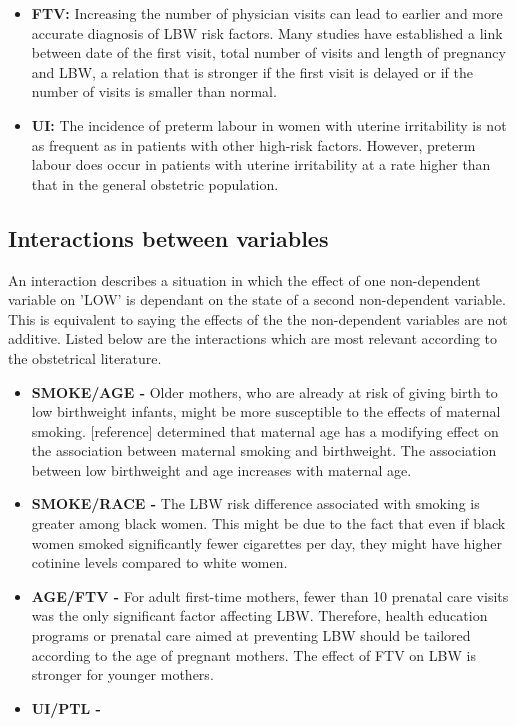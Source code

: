 \begin{itemize}
    \item \textbf{FTV:}
    Increasing the number of physician visits can lead to earlier and more accurate diagnosis of LBW risk factors. Many studies have established a link between date of the first visit, total number of visits and length of pregnancy and LBW, a relation that is stronger if the first visit is delayed or if the number of visits is smaller than normal.\cite{FTV1}\cite{FTV2}\cite{FTV3}
    
    \item \textbf{UI:}
    The incidence of preterm labour in women with uterine irritability is not as frequent as in patients with other high-risk factors. However, preterm labour does occur in patients with uterine irritability at a rate higher than that in the general obstetric population.\cite{UI}
    
    
\end{itemize}

\subsection{Interactions between variables}
An interaction describes a situation in which the effect of one non-dependent variable on 'LOW' is dependant on the state of a second non-dependent variable. This is equivalent to saying the effects of the the non-dependent variables are not additive. Listed below are the interactions which are most relevant according to the obstetrical literature.

\begin{itemize}
    \item \textbf{SMOKE/AGE -}
    Older mothers, who are already at risk of giving birth to low birthweight infants, might be more susceptible to the effects of maternal smoking. [reference] determined that maternal age has a modifying effect on the association between maternal smoking and birthweight. The association between low birthweight and age increases with maternal age.\cite{SmokeAge}
    
    \item \textbf{SMOKE/RACE -}
    The LBW risk difference associated with smoking is greater among black women. This might be due to the fact that even if black women smoked significantly fewer cigarettes per day, they might have higher cotinine levels compared to white women. \cite{SmokeRace}
    
    \item \textbf{AGE/FTV -}
    For adult first-time mothers, fewer than 10 prenatal care visits was the only significant factor affecting LBW. Therefore, health education programs or prenatal care aimed at preventing LBW should be tailored according to the age of pregnant mothers. The effect of FTV on LBW is stronger for younger mothers.\cite{AgeFTV}
    
    \item \textbf{UI/PTL -}
    
    
\end{itemize}

